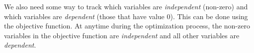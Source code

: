 We also need some way to track which variables are \emph{independent} (non-zero) and which variables are \emph{dependent} (those that have value $0$). This can be done using the objective function. At anytime during the optimization process, the non-zero variables in the objective function are \emph{independent} and all other variables are \emph{dependent}.









